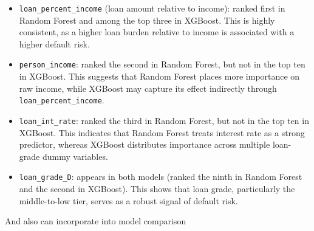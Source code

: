 \documentclass[letterpaper]{article}
\begin{document}
\begin{itemize}
	\item \texttt{loan\_percent\_income} (loan amount relative to income): ranked first in Random Forest and among the top three in XGBoost. This is highly consistent, as a higher loan burden relative to income is associated with a higher default risk.
	
	\item \texttt{person\_income}: ranked the second in Random Forest, but not in the top ten in XGBoost. This suggests that Random Forest places more importance on raw income, while XGBoost may capture its effect indirectly through \texttt{loan\_percent\_income}.
	
	\item \texttt{loan\_int\_rate}: ranked the third in Random Forest, but not in the top ten in XGBoost. This indicates that Random Forest treats interest rate as a strong predictor, whereas XGBoost distributes importance across multiple loan-grade dummy variables.
	
	\item \texttt{loan\_grade\_D}: appears in both models (ranked the ninth in Random Forest and the second in XGBoost). This shows that loan grade, particularly the middle-to-low tier, serves as a robust signal of default risk.
\end{itemize}

And also can incorporate into model comparison
\end{document}
